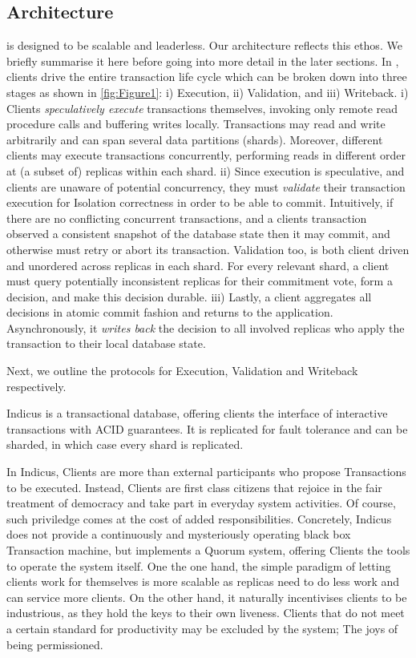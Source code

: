 \subsection{Architecture}
\sys is designed to be scalable and leaderless. Our architecture reflects this ethos. We briefly summarise it here before going into more detail in the later sections. 
In \sys, clients drive the entire transaction life cycle which can be broken down into three stages as shown in \ref{fig:Figure1}: i) Execution, ii) Validation, and iii) Writeback. 
i) Clients \textit{speculatively execute} transactions themselves, invoking only remote read procedure calls and buffering writes locally. Transactions may read and write arbitrarily and can span several data partitions (shards). Moreover, different clients may execute transactions concurrently, performing reads in different order at (a subset of) replicas within each shard. 
ii) Since execution is speculative, and clients are unaware of potential concurrency, they must \textit{validate} their transaction execution for Isolation correctness in order to be able to commit. Intuitively, if there are no conflicting concurrent transactions, and a clients transaction observed a consistent snapshot of the database state then it may commit, and otherwise must retry or abort its transaction. Validation too, is both client driven and unordered across replicas in each shard. For every relevant shard, a client must query potentially inconsistent replicas for their commitment vote, form a decision, and make this decision durable. 
iii) Lastly, a client aggregates all decisions in atomic commit fashion and returns to the application. Asynchronously, it \textit{writes back} the decision to all involved replicas who apply the transaction to their local database state.

Next, we outline the protocols for Execution, Validation and Writeback respectively. 

Indicus is a transactional database, offering clients the interface of interactive transactions with ACID guarantees. It is replicated for fault tolerance and can be sharded, in which case every shard is replicated. 

In Indicus, Clients are more than external participants who propose Transactions to be executed. Instead, Clients are first class citizens that rejoice in the fair treatment of democracy and take part in everyday system activities. Of course, such priviledge comes at the cost of added responsibilities. Concretely, Indicus does not provide a continuously and mysteriously operating black box Transaction machine, but implements a Quorum system, offering Clients the tools to operate the system itself. One the one hand, the simple paradigm of letting clients work for themselves is more scalable as replicas need to do less work and can service more clients. On the other hand, it naturally incentivises clients to be industrious, as they hold the keys to their own liveness. Clients that do not meet a certain standard for productivity may be excluded by the system; The joys of being permissioned.


